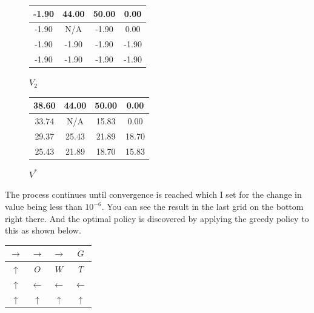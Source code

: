 \documentclass{article}
\begin{document}
\begin{figure}[H]
    \centering
    \begin{minipage}{0.3\textwidth}
        \centering
        \begin{tabular}{|c|c|c|c|}
        \hline
        -1.90 & 44.00 & 50.00 & 0.00 \\
        \hline
        -1.90 & N/A & -1.90 & 0.00 \\
        \hline
        -1.90 & -1.90 & -1.90 & -1.90 \\
        \hline
        -1.90 & -1.90 & -1.90 & -1.90 \\
        \hline
        \end{tabular}
        \vspace{0.5em}
        \small $V_2$
    \end{minipage}
    \hfill
    \begin{minipage}{0.3\textwidth}
        \centering
        \begin{tabular}{|c|c|c|c|}
        \hline
        38.60 & 44.00 & 50.00 & 0.00 \\
        \hline
        33.74 & N/A & 15.83 & 0.00 \\
        \hline
        29.37 & 25.43 & 21.89 & 18.70 \\
        \hline
        25.43 & 21.89 & 18.70 & 15.83 \\
        \hline
        \end{tabular}
        \vspace{0.5em}
        \small $V^*$
    \end{minipage}
\end{figure}

The process continues until convergence is reached which I set for the change in value being less than $10^{-6}$.
You can see the result in the last grid on the bottom right there.
And the optimal policy is discovered by applying the greedy policy to this as shown below.

\begin{center}
\begin{tabular}{|c|c|c|c|}
\hline
$\rightarrow$ & $\rightarrow$ & $\rightarrow$ & $G$ \\
\hline
$\uparrow$ & $O$ & $W$ & $T$ \\
\hline
$\uparrow$ & $\leftarrow$ & $\leftarrow$ & $\leftarrow$ \\
\hline
$\uparrow$ & $\uparrow$ & $\uparrow$ & $\uparrow$ \\
\hline
\end{tabular}
\end{center}
\end{document}
